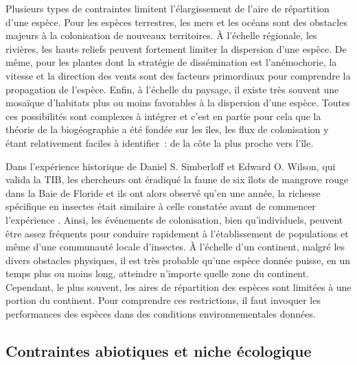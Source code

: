 Plusieurs types de contraintes limitent l'élargissement de l'aire de
répartition d'une espèce. Pour les espèces terrestres, les mers et les
océans sont des obstacles majeurs à la colonisation de nouveaux
territoires. À l'échelle régionale, les rivières, les hauts reliefs
peuvent fortement limiter la dispersion d'une espèce. De même, pour les
plantes dont la stratégie de dissémination est l'anémochorie, la vitesse
et la direction des vents sont des facteurs primordiaux pour comprendre
la propagation de l'espèce. Enfin, à l'échelle du paysage, il existe
très souvent une mosaïque d'habitats plus ou moins favorables à la
dispersion d'une espèce. Toutes ces possibilités sont complexes à
intégrer et c'est en partie pour cela que la théorie de la biogéographie
a été fondée sur les îles, les flux de colonisation y étant relativement
faciles à identifier~: de la côte la plus proche vers l'île.

Dans l'expérience historique de Daniel S. Simberloff et Edward O.
Wilson, qui valida la TIB, les chercheurs ont éradiqué la faune de six
îlots de mangrove rouge dans la Baie de Floride et ils ont alors observé
qu'en une année, la richesse spécifique en insectes était similaire à
celle constatée avant de commencer l'expérience \citep{Simberloff1969}.
Ainsi, les événements de colonisation, bien qu'individuels, peuvent être
assez fréquents pour conduire rapidement à l'établissement de
populations et même d'une communauté locale d'insectes. À l'échelle d'un
continent, malgré les divers obstacles physiques, il est très probable
qu'une espèce donnée puisse, en un temps plus ou moins long, atteindre
n'importe quelle zone du continent. Cependant, le plus souvent, les
aires de répartition des espèces sont limitées à une portion du
continent. Pour comprendre ces restrictions, il faut invoquer les
performances des espèces dans des conditions environnementales données.

\subsection*{Contraintes abiotiques et niche
écologique}\label{contraintes-abiotiques-et-niche-uxe9cologique}


